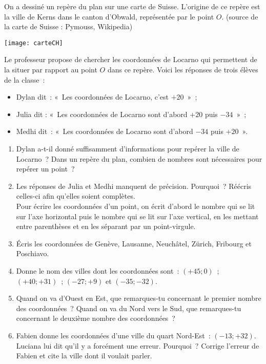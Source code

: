 \begin{activite}

On a dessiné un repère du plan sur une carte de Suisse. L'origine de ce repère est la ville de Kerns dans le canton d'Obwald, représentée par le point $O$. \scriptsize{(source de la carte de Suisse : Pymouss, Wikipedia)}

\begin{center} \texttt{[image: carteCH]} \end{center}
\normalsize{Le professeur propose de chercher les coordonnées de Locarno qui permettent de la situer par rapport au point $O$ dans ce repère. Voici les réponses de trois élèves de la classe :}
\begin{itemize}
 \item Dylan dit : « Les coordonnées de Locarno, c'est $+ 20$ » ;
 \item Julia dit : « Les coordonnées de Locarno sont d'abord $+ 20$ puis $- 34$ » ;
 \item Medhi dit : « Les coordonnées de Locarno sont d'abord $- 34$ puis $+ 20$ ».
 \end{itemize}
 \begin{enumerate}
  \item Dylan a-t-il donné suffisamment d'informations pour repérer la ville de Locarno ? Dans un repère du plan, combien de nombres sont nécessaires pour repérer un point ?
  \item Les réponses de Julia et Medhi manquent de précision. Pourquoi ? Réécris celles-ci afin qu'elles soient complètes. \\[1em]
Pour écrire les coordonnées d'un point, on écrit d'abord le nombre qui se lit sur l'axe horizontal puis le nombre qui se lit sur l'axe vertical, en les mettant entre parenthèses et en les séparant par un point-virgule.
  \item Écris les coordonnées de Genève, Lausanne, Neuchâtel, Zürich, Fribourg et Poschiavo.
  \item Donne le nom des villes dont les coordonnées sont : $(+ 45 ; 0)$ ; $(+ 40 ; + 31)$ ;­ $(- 27 ; + 9)$ et $(- 35 ; - 32)$.
  \item Quand on va d'Ouest en Est, que remarques-tu concernant le premier nombre des coordonnées ? Quand on va du Nord vers le Sud, que remarques-tu concernant le deuxième nombre des coordonnées ?
  \item Fabien donne les coordonnées d'une ville du quart Nord-Est : $(- 13 ; + 32)$. Luciana lui dit qu'il y a forcément une erreur. Pourquoi ? Corrige l'erreur de Fabien et cite la ville dont il voulait parler.
  \end{enumerate}
  
\end{activite}

